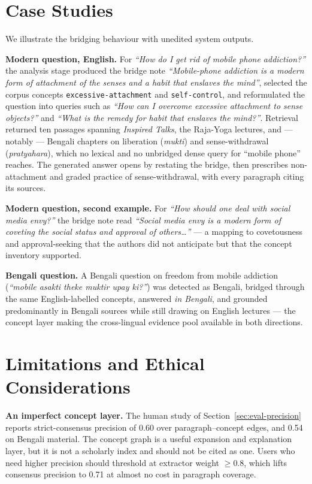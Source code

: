 \documentclass[pdflatex,sn-mathphys-num]{sn-jnl}
\begin{document}
\section{Case Studies}
\label{sec:cases}

We illustrate the bridging behaviour with unedited system outputs.

\textbf{Modern question, English.} For \emph{``How do I get rid of
mobile phone addiction?''} the analysis stage produced the bridge note
\emph{``Mobile-phone addiction is a modern form of attachment of the
senses and a habit that enslaves the mind''}, selected the corpus
concepts \texttt{excessive-attachment} and \texttt{self-control}, and
reformulated the question into queries such as \emph{``How can I
overcome excessive attachment to sense objects?''} and \emph{``What is
the remedy for habit that enslaves the mind?''}. Retrieval returned ten
passages spanning \emph{Inspired Talks}, the Raja-Yoga lectures, and ---
notably --- Bengali chapters on liberation (\emph{mukti}) and
sense-withdrawal (\emph{pratyahara}), which no lexical and no unbridged
dense query for ``mobile phone'' reaches. The generated answer opens by
restating the bridge, then prescribes non-attachment and graded practice
of sense-withdrawal, with every paragraph citing its sources.

\textbf{Modern question, second example.} For \emph{``How should one
deal with social media envy?''} the bridge note read \emph{``Social
media envy is a modern form of coveting the social status and approval
of others\ldots''} --- a mapping to covetousness and approval-seeking
that the authors did not anticipate but that the concept inventory
supported.

\textbf{Bengali question.} A Bengali question on freedom from mobile
addiction (\emph{``mobile asakti theke muktir upay ki?''}) was detected
as Bengali, bridged through the same English-labelled concepts, answered
\emph{in Bengali}, and grounded predominantly in Bengali sources while
still drawing on English lectures --- the concept layer making the
cross-lingual evidence pool available in both directions.

\section{Limitations and Ethical Considerations}
\label{sec:limitations}

\textbf{An imperfect concept layer.} The human study of
Section~\ref{sec:eval-precision} reports strict-consensus precision of
0.60 over paragraph--concept edges, and 0.54 on Bengali material. The
concept graph is a useful expansion and explanation layer, but it is not
a scholarly index and should not be cited as one. Users who need higher
precision should threshold at extractor weight $\geq 0.8$, which lifts
consensus precision to 0.71 at almost no cost in paragraph coverage.
\end{document}
